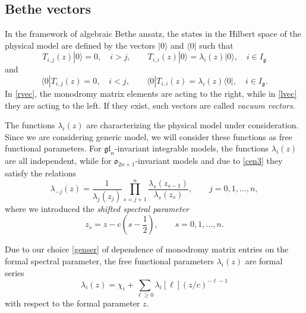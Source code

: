 \documentclass[pdftex]{sigma}
\theoremstyle{definition}
\def\r#1{\eqref{#1}}
\def\Ig{I_{\mathfrak{g}}}
\def\rvec{|0\rangle}
\def\lvec{\langle0|}
\def\vk{\chi}
\begin{document}
\subsection{Bethe vectors}

In the framework of algebraic Bethe ansatz, the states in the
Hilbert space of the physical model are defined by the vectors $\rvec$ and $\lvec$
such that
\begin{equation}\label{rvec}
T_{i,j}(z)\rvec =0 ,\quad i>j ,\qquad T_{i,i}(z)\rvec=\lambda_i(z)\rvec ,\quad i\in\Ig
\end{equation}
and
\begin{equation}\label{lvec}
\lvec T_{i,j}(z) =0 ,\quad i<j ,\qquad \lvec T_{i,i}(z)=\lambda_i(z)\lvec ,\quad i\in\Ig .
\end{equation}
In \r{rvec}, the monodromy matrix elements are acting to the right, while in \r{lvec}
they are acting to the left. If they exist, such vectors are called {\it vacuum vectors}.

The functions $\lambda_i(z)$ are characterizing the physical model under
consideration. Since we are
considering generic model, we will consider these functions as free functional
parameters. For $\mathfrak{gl}_n$-invariant
integrable models, the functions $\lambda_i(z)$ are all independent, while for
$\mathfrak{o}_{2n+1}$-invariant models and due to \r{cen3}
they satisfy the relations \cite{LP1}
\begin{equation}\label{lam}
\lambda_{-j}(z)=\frac{1}{\lambda_{j}(z_j)}\prod_{s=j+1}^n\frac{\lambda_s(z_{s-1})}{\lambda_s(z_s)},\qquad j=0,1,\dots,n ,
\end{equation}
where we introduced the \textit{shifted spectral parameter}
\begin{equation}\label{zs}
z_s=z-c\left(s-\frac12\right),\qquad s=0,1,\dots,n .
\end{equation}

Due to our choice \r{genser} of dependence of monodromy matrix entries
on the formal spectral parameter, the free functional parameters $\lambda_i(z)$
are formal series
\[%
\lambda_i(z)=\vk_i+\sum_{\ell\geq 0}\lambda_i[\ell] (z/c)^{-\ell-1}
\]
with respect to the formal parameter $z$.
\end{document}
